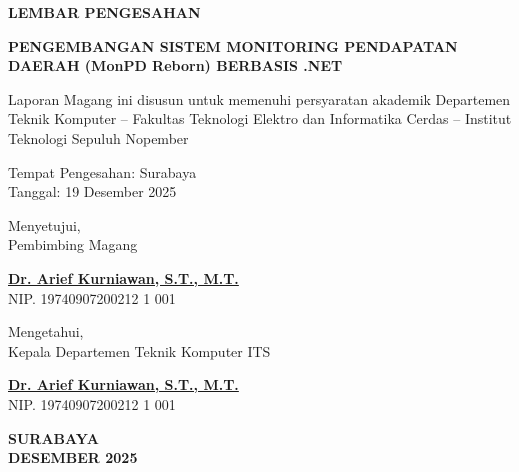 \thispagestyle{empty}      %

\begin{center}
  {\Large \textbf{LEMBAR PENGESAHAN}}
  
  \vspace{2ex}


  {\large \textbf{PENGEMBANGAN SISTEM MONITORING PENDAPATAN DAERAH (MonPD Reborn) BERBASIS .NET}}
  
  \vspace{2ex}

  Laporan Magang ini disusun untuk memenuhi persyaratan akademik Departemen Teknik Komputer – Fakultas Teknologi Elektro dan Informatika Cerdas – Institut Teknologi Sepuluh Nopember
  
  \vspace{2ex}

  Tempat Pengesahan: Surabaya \\
  Tanggal: 19 Desember 2025
  \vspace{4ex}

  Menyetujui, \\
  Pembimbing Magang
  
  \vspace{12ex}

  \textbf{\underline{Dr. Arief Kurniawan, S.T., M.T.}} \\
  NIP. 19740907200212 1 001
  
  \vspace{4ex}

  Mengetahui, \\
  Kepala Departemen Teknik Komputer ITS
  
  \vspace{12ex}

  \textbf{\underline{Dr. Arief Kurniawan, S.T., M.T.}} \\
  NIP. 19740907200212 1 001

  \vfill

  \textbf{SURABAYA} \\
  \textbf{DESEMBER 2025}

\end{center}
